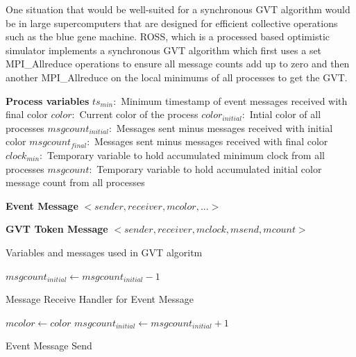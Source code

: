 \documentclass[11pt]{book}
\begin{document}
One situation that would be well-suited for a synchronous GVT algorithm would be in large
supercomputers that are designed for efficient collective operations such as the blue gene machine.
ROSS, which is a processed based optimistic simulator implements a synchronous GVT algorithm which
first uses a set MPI\_Allreduce operations to ensure all message counts add up to zero and then
another MPI\_Allreduce on the local minimums of all processes to get the GVT.


\begin{algorithm}
\DontPrintSemicolon

\textbf{Process variables}\;
\boldmath$ts_{min}:$ Minimum timestamp of event messages received with final color\;
\boldmath$color:$ Current color of the process\;
\boldmath$color_{initial}:$ Intial color of all processes\;
\boldmath$msgcount_{initial}:$ Messages sent minus messages received with initial color\;
\boldmath$msgcount_{final}:$ Messages sent minus messages received with final color\;
\boldmath$clock_{min}:$ Temporary variable to hold accumulated minimum clock from all processes\;
\boldmath$msgcount:$ Temporary variable to hold accumulated initial color message count from all processes\;\;

\textbf{Event Message}\;
$<sender, receiver, mcolor,...>$\;\;

\textbf{GVT Token Message}\;
$<sender, receiver, mclock, msend, mcount>$\;

\caption{Variables and messages used in GVT algoritm}
\end{algorithm}

\begin{algorithm}
\DontPrintSemicolon
\SetAlgoVlined

   {
    $msgcount_{initial} \gets msgcount_{initial} - 1$\;
  }

\caption{Message Receive Handler for Event Message}
\end{algorithm}


\begin{algorithm}
\DontPrintSemicolon
\SetAlgoVlined

    $mcolor \gets color$\;
     {
      $msgcount_{initial} \gets msgcount_{initial} + 1$\;
    }

\caption{Event Message Send}
\end{algorithm}
\end{document}
